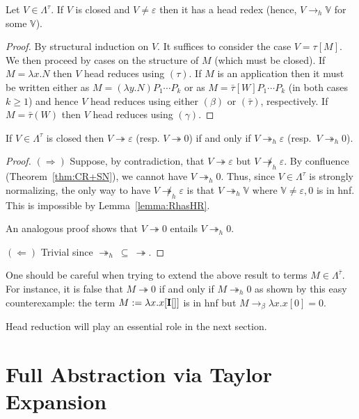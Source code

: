 \documentclass{LMCS}
\newcommand{\lam}{\ensuremath{\lambda}}
\newcommand{\Set}[1]{\Lambda^{#1}}
\newcommand{\msto}{\twoheadrightarrow}
\newcommand{\toh}{\to_{h}}\newcommand{\mstoh}{\msto_{h}}\newcommand{\lsubst}[2]{\langle #2 / #1 \rangle}	\newcommand{\llsubst}[2]{\langle\!\langle #2 / #1 \rangle\!\rangle}
\newcommand{\ass}{:=}
\newcommand{\sV}{\mathbb{V}}
\newcommand{\gb}{\beta}
\newcommand{\gt}{\ensuremath{\tau}}
\newcommand{\gto}{\ensuremath{\bar\tau}}
\begin{document}
\begin{lem}\label{lemma:RhasHR} 
Let $V\in\Set{\gt}$. If $V$ is closed and $V\neq \varepsilon$ then it has a head redex
(hence, $V\toh \sV$ for some $\sV$).
\end{lem}

\begin{proof} 
By structural induction on $V$.
It suffices to consider the case 
$V = \gt[M]$. 
We then proceed by cases on the structure of $M$ (which must be closed).
If $M = \lam x.N$ then $V$ head reduces using $(\gt)$.
If $M$ is an application then it must be written either as $M = (\lambda y.N)P_1\cdots P_k$ 
or as $M=\gto[W]P_1\cdots P_k$ (in both cases $k\geq 1$) and hence $V$ head reduces using either $(\gb)$ or $(\gto)$, respectively.
If $M = \gto(W)$ then $V$ head reduces using $(\gamma)$.
\end{proof}

\begin{lem}\label{lemma:RgoeiffRgohe} 
If $V\in\Set{\gt}$ is closed then $V\msto \varepsilon$ (resp. $V\msto 0$) if and only if $V\mstoh \varepsilon$ (resp.\ $V\mstoh 0$).
\end{lem}

\begin{proof} $(\Rightarrow)$ 
Suppose, by contradiction, that $V\msto\varepsilon$ but $V\not\mstoh\varepsilon$. 
By confluence (Theorem~\ref{thm:CR+SN}), we cannot have $V\mstoh 0$. 
Thus, since $V\in\Set{\gt}$ is strongly normalizing, the only way to have $V\not\mstoh\varepsilon$ is that $V\mstoh \sV$ where $\sV\neq\varepsilon,0$ is in hnf.
This is impossible by Lemma~\ref{lemma:RhasHR}.

An analogous proof shows that $V\msto 0$ entails $V\mstoh 0$.

$(\Leftarrow)$ Trivial since $\mstoh\ \subseteq\ \msto$.
\end{proof}

\begin{rem}
One should be careful when trying to extend the above result to terms $M\in\Set{\gto}$.
For instance, it is false that $M\msto 0$ if and only if $M\mstoh 0$ as shown by this easy counterexample:
the term $M \ass \lam x.x[\bold{I}[]]$ is in hnf but $M\to_\beta \lam x.x[0] = 0$.
\end{rem}

Head reduction will play an essential role in the next section.


\section{Full Abstraction via Taylor Expansion}\label{sec:TaylorExp}
\end{document}

